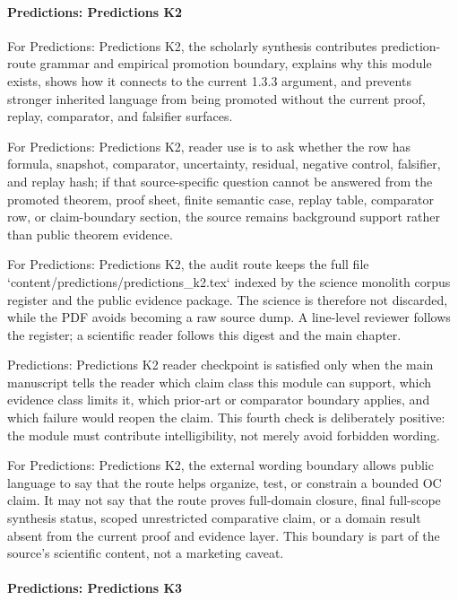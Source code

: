 \paragraph{Predictions: Predictions K2}

For Predictions: Predictions K2, the scholarly synthesis contributes prediction-route grammar and empirical promotion boundary, explains why this module exists, shows how it connects to the current 1.3.3 argument, and prevents stronger inherited language from being promoted without the current proof, replay, comparator, and falsifier surfaces.


For Predictions: Predictions K2, reader use is to ask whether the row has formula, snapshot, comparator, uncertainty, residual, negative control, falsifier, and replay hash; if that source-specific question cannot be answered from the promoted theorem, proof sheet, finite semantic case, replay table, comparator row, or claim-boundary section, the source remains background support rather than public theorem evidence.


For Predictions: Predictions K2, the audit route keeps the full file `content/predictions/predictions\_k2.tex` indexed by the science monolith corpus register and the public evidence package. The science is therefore not discarded, while the PDF avoids becoming a raw source dump. A line-level reviewer follows the register; a scientific reader follows this digest and the main chapter.


Predictions: Predictions K2 reader checkpoint is satisfied only when the main manuscript tells the reader which claim class this module can support, which evidence class limits it, which prior-art or comparator boundary applies, and which failure would reopen the claim. This fourth check is deliberately positive: the module must contribute intelligibility, not merely avoid forbidden wording.


For Predictions: Predictions K2, the external wording boundary allows public language to say that the route helps organize, test, or constrain a bounded OC claim. It may not say that the route proves full-domain closure, final full-scope synthesis status, scoped unrestricted comparative claim, or a domain result absent from the current proof and evidence layer. This boundary is part of the source's scientific content, not a marketing caveat.


\paragraph{Predictions: Predictions K3}

